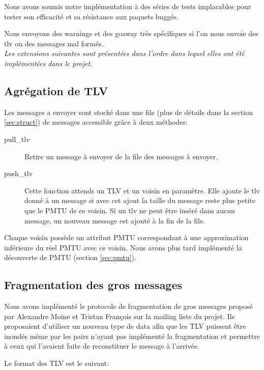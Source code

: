 \documentclass[a4paper,10pt]{article} %
\begin{document}
Nous avons soumis notre implémentation à des séries de tests implacables pour tester son efficacité et sa résistance aux paquets buggés.

Nous envoyons des warnings et des goaway très spécifiques si l'on nous envoie des tlv ou des messages mal formés.\\


\textit{Les extensions suivantes sont présentées dans l'ordre dans lequel elles ont été implémentées dans le projet.}

\subsection{Agrégation de TLV\label{sec:agrega}}
Les messages a envoyer sont stocké dans une file (plus de détails dans la section \ref{sec:struct}) de messages accessible grâce à deux méthodes:

\begin{description}
\item[pull\_tlv] Retire un message à envoyer de la file des messages à envoyer.
\item[push\_tlv] Cette fonction attends un TLV et un voisin en paramètre. Elle ajoute le tlv donné à un message si avec cet ajout la taille du message reste plus petite que le PMTU de ce voisin. Si un tlv ne peut être inséré dans aucun message, un nouveau message est ajouté à la fin de la file.
\end{description}

Chaque voisin possède un attribut \textrm{PMTU} correspondant à une approximation inférieure du réel \textrm{PMTU} avec ce voisin. Nous avons plus tard implémenté la découverte de PMTU (section \ref{sec:pmtu}).

\subsection{Fragmentation des gros messages\label{sec:frag}}
Nous avons implémenté le protocole de fragmentation de gros messages proposé par \textrm{Alexandre Moine} et \textrm{Tristan François} sur la mailing liste du projet. Ils proposaient d'utiliser un nouveau type de data afin que les TLV puissent être inondés même par les pairs n'ayant pas implémenté la fragmentation et permettre à ceux qui l'avaient faite de reconstituer le message à l'arrivée.

Le format des TLV est le suivant:
\end{document}
